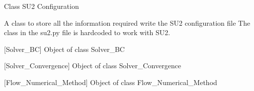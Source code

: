 \documentclass[letterpaper,10pt,english]{sphinxmanual}
\begin{document}
\begin{fulllineitems}
\label{\detokenize{modules:su2.SU2_Config}}
\pysigstartsignatures
{}
\pysigstopsignatures
\sphinxAtStartPar
Class SU2 Configuration

\sphinxAtStartPar
A class to store all the information required write the SU2 configuration file
The class in the su2.py file is hardcoded to work with SU2.

\begin{fulllineitems}
\label{\detokenize{modules:su2.SU2_Config.bc}}
\pysigstartsignatures
{}
\pysigstopsignatures
\sphinxAtStartPar
{[}Solver\_BC{]} Object of class Solver\_BC

\end{fulllineitems}


\begin{fulllineitems}
\label{\detokenize{modules:su2.SU2_Config.convergence}}
\pysigstartsignatures
{}
\pysigstopsignatures
\sphinxAtStartPar
{[}Solver\_Convergence{]} Object of class Solver\_Convergence

\end{fulllineitems}


\begin{fulllineitems}
\label{\detokenize{modules:su2.SU2_Config.flow}}
\pysigstartsignatures
{}
\pysigstopsignatures
\sphinxAtStartPar
{[}Flow\_Numerical\_Method{]} Object of class Flow\_Numerical\_Method

\end{fulllineitems}



\end{fulllineitems}
\end{document}
